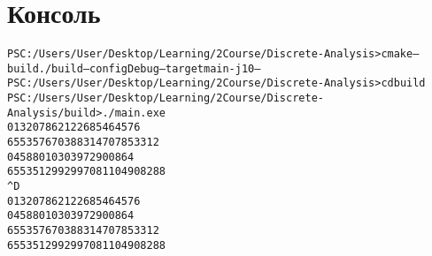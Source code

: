 \section{Консоль}
\begin{alltt}
PS C:/Users/User/Desktop/Learning/2Course/Discrete-Analysis> cmake --build ./build --config Debug --target main -j 10 --
PS C:/Users/User/Desktop/Learning/2Course/Discrete-Analysis> cd build
PS C:/Users/User/Desktop/Learning/2Course/Discrete-Analysis/build> ./main.exe
0	13207862122685464576
65535	7670388314707853312
0	4588010303972900864
65535	12992997081104908288
^D
0	13207862122685464576
0	4588010303972900864
65535	7670388314707853312
65535	12992997081104908288
\end{alltt}
\pagebreak

